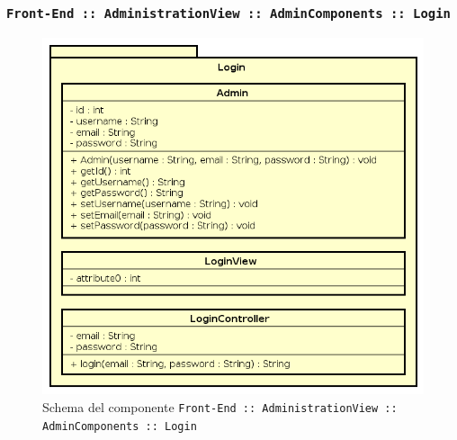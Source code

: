 \documentclass[../DefinizioneDiProdotto.tex]{subfiles}
\begin{document}
	\subsubsection{ \texttt{Front-End :: AdministrationView :: AdminComponents :: Login}}
		\begin{figure}[!h]
			\centering
			\includegraphics[scale=0.7]{Architettura/Front-End/Administration/AdminComponents/Login.png}
			\caption{Schema del componente \texttt{Front-End :: AdministrationView :: AdminComponents :: Login}}
		\end{figure}
\end{document}
